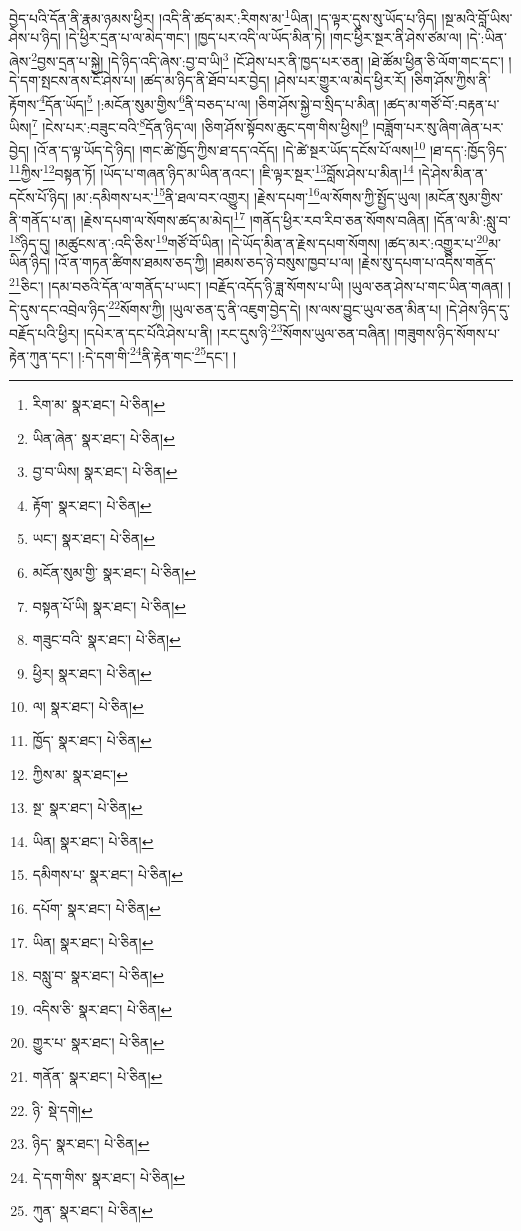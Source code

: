 བྱེད་པའི་དོན་ནི་རྣམ་ཉམས་ཕྱིར། །འདི་ནི་ཚད་མར་:རིགས་མ་\footnote{རིག་མ་  སྣར་ཐང་།  པེ་ཅིན། }ཡིན། །ད་ལྟར་དུས་སུ་ཡོད་པ་ཉིད། །སྔ་མའི་བློ་ཡིས་ཤེས་པ་ཉིད། །དེ་ཕྱིར་དྲན་པ་ལ་མེད་གང་། །ཁྱད་པར་འདི་ལ་ཡོད་མིན་ཏེ། །གང་ཕྱིར་སྔར་ནི་ཤེས་ཙམ་ལ། །དེ་:ཡིན་ཞེས་\footnote{ཡིན་ཞེན་  སྣར་ཐང་།  པེ་ཅིན། }བྱས་དྲན་པ་སྐྱེ། །དེ་ཉིད་འདི་ཞེས་:བྱ་བ་ཡི།\footnote{བྱ་བ་ཡིས།  སྣར་ཐང་།  པེ་ཅིན། } །ངོ་ཤེས་པར་ནི་ཁྱད་པར་ཅན། །ཐེ་ཚོམ་ཕྱིན་ཅི་ལོག་གང་དང་། །དེ་དག་སྤངས་ནས་ངོ་ཤེས་པ། །ཚད་མ་ཉིད་ནི་ཐོབ་པར་བྱེད། །ཤེས་པར་གྱུར་ལ་མེད་ཕྱིར་རོ། །ཅིག་ཤོས་ཀྱིས་ནི་རྟོགས་\footnote{རྟོག་  སྣར་ཐང་།  པེ་ཅིན། }དོན་ཡོད།\footnote{ཡང་།  སྣར་ཐང་།  པེ་ཅིན། } །:མངོན་སུམ་གྱིས་\footnote{མངོན་སུམ་གྱི་  སྣར་ཐང་།  པེ་ཅིན། }ནི་བཅད་པ་ལ། །ཅིག་ཤོས་སྐྱེ་བ་སྲིད་པ་མིན། །ཚད་མ་གཙོ་བོ་:བརྟན་པ་ཡིས།\footnote{བསྟན་པོ་ཡི།  སྣར་ཐང་།  པེ་ཅིན། } །ངེས་པར་:བཟུང་བའི་\footnote{གཟུང་བའི་  སྣར་ཐང་།  པེ་ཅིན། }དོན་ཉིད་ལ། །ཅིག་ཤོས་སྟོབས་ཆུང་དག་གིས་ཕྱིས།\footnote{ཕྱིར།  སྣར་ཐང་།  པེ་ཅིན། } །བཟློག་པར་སུ་ཞིག་ཞེན་པར་བྱེད། །འོ་ན་ད་ལྟ་ཡོད་དེ་ཉིད། །གང་ཚེ་ཁྱོད་ཀྱིས་ཐ་དད་འདོད། །དེ་ཚེ་སྔར་ཡོད་དངོས་པོ་ལས།\footnote{ལ།  སྣར་ཐང་།  པེ་ཅིན། } །ཐ་དད་:ཁྱོད་ཉིད་\footnote{ཁྱོད་  སྣར་ཐང་།  པེ་ཅིན། }ཀྱིས་\footnote{ཀྱིས་མ་  སྣར་ཐང་། }བསྟན་ཏོ། །ཡོད་པ་གཞན་ཉིད་མ་ཡིན་ནའང་། །ཇི་ལྟར་སྔར་\footnote{སྔ་  སྣར་ཐང་།  པེ་ཅིན། }བློས་ཤེས་པ་མིན།\footnote{ཡིན།  སྣར་ཐང་།  པེ་ཅིན། } །དེ་ཤེས་མིན་ན་དངོས་པོ་ཉིད། །མ་:དམིགས་པར་\footnote{དམིགས་པ་  སྣར་ཐང་།  པེ་ཅིན། }ནི་ཐལ་བར་འགྱུར། །རྗེས་དཔག་\footnote{དཔོག་  སྣར་ཐང་།  པེ་ཅིན། }ལ་སོགས་ཀྱི་སྤྱོད་ཡུལ། །མངོན་སུམ་གྱིས་ནི་གནོད་པ་ན། །རྗེས་དཔག་ལ་སོགས་ཚད་མ་མེད།\footnote{ཡིན།  སྣར་ཐང་།  པེ་ཅིན། } །གནོད་ཕྱིར་རབ་རིབ་ཅན་སོགས་བཞིན། །དོན་ལ་མི་:སླུ་བ་\footnote{བསླུ་བ་  སྣར་ཐང་།  པེ་ཅིན། }ཉིད་དུ། །མཚུངས་ན་:འདི་ཅིས་\footnote{འདིས་ཅི་  སྣར་ཐང་།  པེ་ཅིན། }གཙོ་བོ་ཡིན། །དེ་ཡོད་མིན་ན་རྗེས་དཔག་སོགས། །ཚད་མར་:འགྱུར་པ་\footnote{གྱུར་པ་  སྣར་ཐང་།  པེ་ཅིན། }མ་ཡིན་ཉིད། །འོ་ན་གཏན་ཚིགས་ཐམས་ཅད་ཀྱི། །ཐམས་ཅད་ཉེ་བསུས་ཁྱབ་པ་ལ། །རྗེས་སུ་དཔག་པ་འདིས་གནོད་\footnote{གནོན་  སྣར་ཐང་།  པེ་ཅིན། }ཅིང་། །དམ་བཅའི་དོན་ལ་གནོད་པ་ཡང་། །བརྗོད་འདོད་ཉི་ཟླ་སོགས་པ་ཡི། །ཡུལ་ཅན་ཤེས་པ་གང་ཡིན་གཞན། །དེ་དུས་དང་འབྲེལ་ཉིད་\footnote{ཉི་  སྡེ་དགེ། }སོགས་ཀྱི། །ཡུལ་ཅན་དུ་ནི་འཇུག་བྱེད་དེ། །ས་ལས་བྱུང་ཡུལ་ཅན་མིན་པ། །དེ་ཤེས་ཉིད་དུ་བརྗོད་པའི་ཕྱིར། །དཔེར་ན་དང་པོའི་ཤེས་པ་ནི། །རང་དུས་ཉི་\footnote{ཉིད་  སྣར་ཐང་།  པེ་ཅིན། }སོགས་ཡུལ་ཅན་བཞིན། །གཟུགས་ཉིད་སོགས་པ་རྟེན་ཀུན་དང་། །:དེ་དག་གི་\footnote{དེ་དག་གིས་  སྣར་ཐང་།  པེ་ཅིན། }ནི་རྟེན་གང་\footnote{ཀུན་  སྣར་ཐང་།  པེ་ཅིན། }དང་། །
